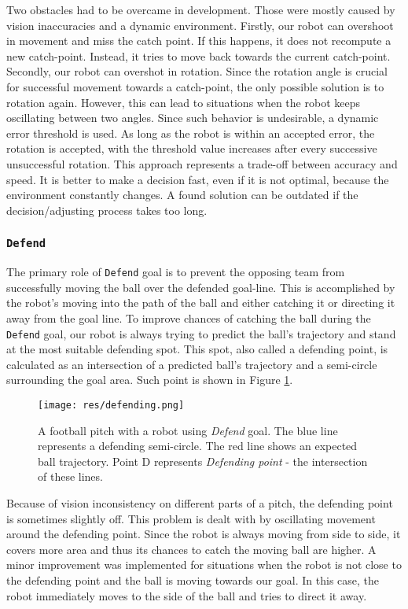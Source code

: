 Two obstacles had to be overcame in development. Those were mostly caused by
vision inaccuracies and a dynamic environment. Firstly, our robot can overshoot
in movement and miss the catch point. If this happens, it does not recompute a
new catch-point. Instead, it tries to move back towards the current
catch-point. Secondly, our robot can overshot in rotation. Since the rotation
angle is crucial for successful movement towards a catch-point, the only
possible solution is to rotation again. However, this can lead to situations
when the robot keeps oscillating between two angles. Since such behavior is
undesirable, a dynamic error threshold is used. As long as the robot is within
an accepted error, the rotation is accepted, with the threshold value increases
after every successive unsuccessful rotation. This approach represents a
trade-off between accuracy and speed. It is better to make a decision fast,
even if it is not optimal, because the environment constantly changes. A found
solution can be outdated if the decision/adjusting process takes too long.

\subsubsection{\texttt{Defend}}

The primary role of \texttt{Defend} goal is to prevent the opposing team from
successfully moving the ball over the defended goal-line. This is accomplished
by the robot's moving into the path of the ball and either catching it or
directing it away from the goal line. To improve chances of catching the ball
during the \texttt{Defend} goal, our robot is always trying to predict the
ball's trajectory and stand at the most suitable defending spot. This spot,
also called a defending point, is calculated as an intersection of a predicted
ball's trajectory and a semi-circle surrounding the goal area. Such point is
shown in Figure \ref{fig:defendingpoint}.

\begin{figure}[H]
	\begin{center}
    \texttt{[image: res/defending.png]}
    \caption{A football pitch with a robot using \emph{Defend} goal. The blue line represents a defending semi-circle. The red line shows an expected ball trajectory. Point D represents \emph{Defending point} - the intersection of these lines.}
    \label{fig:defendingpoint}
	\end{center}
\end{figure}

Because of vision inconsistency on different parts of a pitch, the defending
point is sometimes slightly off. This problem is dealt with by oscillating
movement around the defending point. Since the robot is always moving from side
to side, it covers more area and thus its chances to catch the moving ball are
higher. A minor improvement was implemented for situations when the robot is not
close to the defending point and the ball is moving towards our goal. In this
case, the robot immediately moves to the side of the ball and tries to direct
it away.
